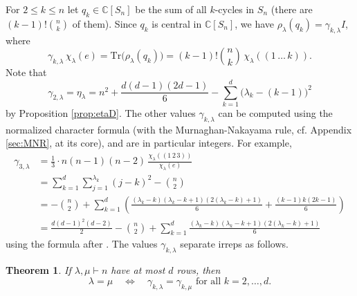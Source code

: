 \documentclass[12pt,dvipsnames,accepted=2016-08-18,a4paper,onecolumn]{quantumarticle}
\numberwithin{equation}{section}
\newcommand{\CC}{\mathbb C}
\newtheorem{theorem}{Theorem}[section]
\theoremstyle{definition}
\begin{document}
For $2\le k\le n$ let $q_k\in \CC[S_n]$ be the sum of all $k$-cycles in $S_n$ (there are $(k-1)!\binom{n}{k}$ of them).
Since $q_k$ is central in $\CC[S_n]$, we have
$\rho_\lambda(q_k)=\gamma_{k,\lambda}I$,
where
\begin{equation}\label{e:gamma}
\gamma_{k,\lambda}\,\chi_\lambda(e) 
= \text{Tr}\big( \rho_\lambda(q_k) \big)=
(k-1)!\binom{n}{k}\,\chi_\lambda((1\,\dots\,k)).
\end{equation}
Note that
$$\gamma_{2,\lambda}=\eta_\lambda=
n^2 +\frac{d(d-1)(2d-1)}{6}
-\sum_{k=1}^d\big( \lambda_k - (k-1)\big)^2
$$
by Proposition \ref{prop:etaD}.
The other values $\gamma_{k,\lambda}$ can be computed using the normalized character formula \cite[Theorem 4]{Lassalle} (with the Murnaghan-Nakayama rule, cf. Appendix \ref{sec:MNR}, at its core), and are in particular integers.
For example,
\begin{align*}
\gamma_{3,\lambda}
&=\frac13\cdot n(n-1)(n-2)\,
\frac{\chi_\lambda((1\,2\,3))}{\chi_\lambda(e)}\\
&=\sum_{k=1}^d\sum_{j=1}^{\lambda_k}(j-k)^2-\binom{n}{2}\\
&=-\binom{n}{2}+\sum_{k=1}^d\left(\frac{(\lambda_k-k)(\lambda_k-k+1)(2(\lambda_k-k)+1)}{6}
+\frac{(k-1)k(2k-1)}{6}
\right)\\
&=\frac{d(d-1)^2(d-2)}{2}-\binom{n}{2}+\sum_{k=1}^d\frac{(\lambda_k-k)(\lambda_k-k+1)(2(\lambda_k-k)+1)}{6}
\end{align*}
using the formula after \cite[Theorem 4]{Lassalle}.
The values $\gamma_{k,\lambda}$ separate irreps as follows.

\begin{theorem}\label{t:sep_all_rows}
If 
$\lambda,\mu\vdash n$ have at most $d$ rows, then
$$\lambda=\mu
\quad\iff\quad \gamma_{k,\lambda}=\gamma_{k,\mu} \text{ for all }k=2,\dots,d.$$
\end{theorem}
\end{document}
